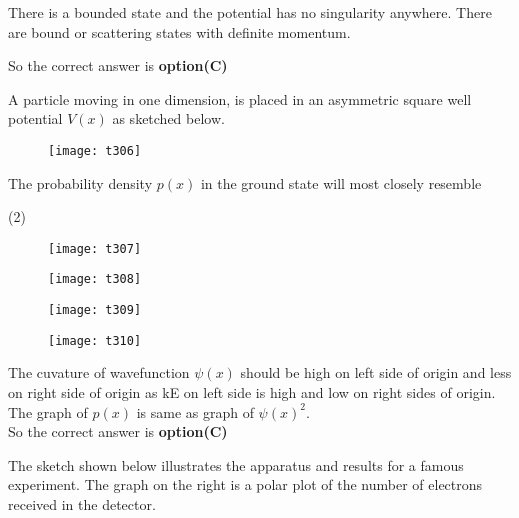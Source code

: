 \begin{questions}
\begin{tasks}
	\task[\textbf{C.}] There is a bounded state and the potential has no singularity anywhere.
	\task[\textbf{D.}]   There are bound or scattering states with definite momentum.
\end{tasks}
\begin{answer}
	So the correct answer is \textbf{option(C)}
\end{answer}
\begin{minipage}{\textwidth}
	\question A particle moving in one dimension, is placed in an asymmetric square well potential $V(x)$ as sketched below.\\
	\begin{figure}[H]
		\centering
		\texttt{[image: t306]}
	\end{figure}
	The probability density $p(x)$ in the ground state will most closely resemble
\end{minipage}
\begin{tasks}(2)
	\task[\textbf{A.}] \begin{figure}[H]
		\centering
		\texttt{[image: t307]}
	\end{figure}
	\task[\textbf{B.}] \begin{figure}[H]
		\centering
		\texttt{[image: t308]}
	\end{figure}
	\task[\textbf{C.}] \begin{figure}[H]
		\centering
		\texttt{[image: t309]}
	\end{figure}
	\task[\textbf{D.}] \begin{figure}[H]
		\centering
		\texttt{[image: t310]}
	\end{figure}
\end{tasks}
\begin{answer}
	The cuvature of wavefunction $\psi(x)$ should be high on left side of origin and less on right side of origin as kE on left side is high and low on right sides of origin. The graph of $p(x)$ is same as graph of $\psi(x)^{2}$.\\
	So the correct answer is \textbf{option(C)}
\end{answer}
\begin{minipage}{\textwidth}
	\question The sketch shown below illustrates the apparatus and results for a famous experiment. The graph on the right is a polar plot of the number of electrons received in the detector.
\end{minipage}
\begin{figure}[H]

\end{figure}
\end{questions}
